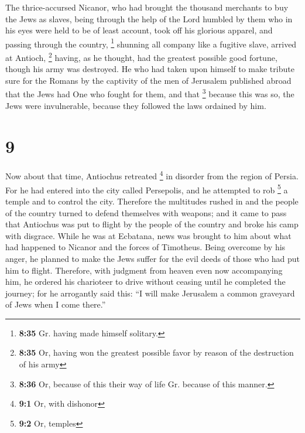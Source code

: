  The thrice-accursed Nicanor, who had brought the
thousand merchants to buy the Jews as slaves,  being
through the help of the Lord humbled by them who in his eyes were held
to be of least account, took off his glorious apparel, and passing
through the country, \footnote{\textbf{8:35} Gr. having made himself
  solitary.} shunning all company like a fugitive slave, arrived at
Antioch, \footnote{\textbf{8:35} Or, having won the greatest possible
  favor by reason of the destruction of his army} having, as he thought,
had the greatest possible good fortune, though his army was destroyed.
 He who had taken upon himself to make tribute sure for
the Romans by the captivity of the men of Jerusalem published abroad
that the Jews had One who fought for them, and that \footnote{\textbf{8:36}
  Or, because of this their way of life Gr. because of this manner.}
because this was so, the Jews were invulnerable, because they followed
the laws ordained by him.

\hypertarget{section-8}{%
\section{9}\label{section-8}}

 Now about that time, Antiochus retreated \footnote{\textbf{9:1}
  Or, with dishonor} in disorder from the region of Persia.
 For he had entered into the city called Persepolis, and
he attempted to rob \footnote{\textbf{9:2} Or, temples} a temple and to
control the city. Therefore the multitudes rushed in and the people of
the country turned to defend themselves with weapons; and it came to
pass that Antiochus was put to flight by the people of the country and
broke his camp with disgrace.  While he was at Ecbatana,
news was brought to him about what had happened to Nicanor and the
forces of Timotheus.  Being overcome by his anger, he
planned to make the Jews suffer for the evil deeds of those who had put
him to flight. Therefore, with judgment from heaven even now
accompanying him, he ordered his charioteer to drive without ceasing
until he completed the journey; for he arrogantly said this: ``I will
make Jerusalem a common graveyard of Jews when I come there.''

